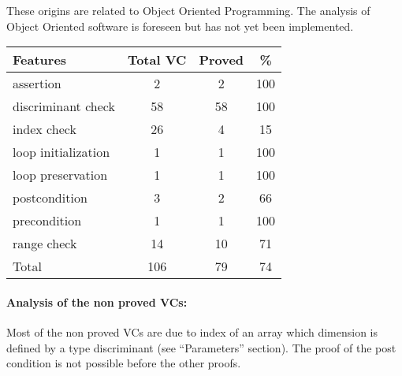 \documentclass[10pt,a4paper,twocolumn]{article}
\begin{document}
These origins are related to Object Oriented Programming. The analysis of Object Oriented software is foreseen but has not yet been implemented.

\vspace{5mm}

\begin{tabular}{|l|c|c|c|}
\hline
Features            & Total VC & Proved & \%  \\ %
\hline
assertion           & 2        & 2      & 100 \\ %
\hline
discriminant check  & 58       & 58     & 100 \\ %
\hline
index check         & 26       & 4      & 15  \\ %
\hline
loop initialization & 1        & 1      & 100 \\ %
\hline
loop  preservation  & 1        & 1      & 100 \\ %
\hline
postcondition       & 3        & 2      & 66  \\ %
\hline
precondition        & 1        & 1      & 100 \\ %
\hline
range check         & 14       & 10     & 71  \\ %
\hline
Total               & 106      & 79     & 74  \\ %
\hline
\end{tabular}


\paragraph{Analysis of the non proved VCs:}
Most of the non proved VCs are due to index of an array which dimension is defined by a type discriminant (see ``Parameters'' section).
The proof of the post condition is not possible before the other proofs.
\end{document}
